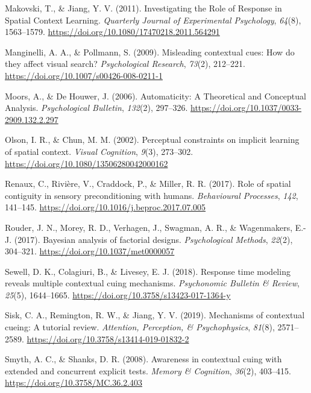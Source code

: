 \documentclass[
  man,
  floatsintext,
  longtable,
  nolmodern,
  notxfonts,
  notimes,
  colorlinks=true,linkcolor=blue,citecolor=blue,urlcolor=blue]{apa7}
\newlength{\cslhangindent}
\newenvironment{CSLReferences}[2] %
 {\begin{list}{}{%
  \setlength{\itemindent}{0pt}
  \setlength{\leftmargin}{0pt}
  \setlength{\parsep}{0pt}
  \ifodd #1
   \setlength{\leftmargin}{\cslhangindent}
   \setlength{\itemindent}{-1\cslhangindent}
  \fi
  \setlength{\itemsep}{#2\baselineskip}}}
 {\end{list}}
\begin{document}
\begin{CSLReferences}{1}{0}
Makovski, T., \& Jiang, Y. V. (2011). Investigating the {Role} of
{Response} in {Spatial Context Learning}. \emph{Quarterly Journal of
Experimental Psychology}, \emph{64}(8), 1563--1579.
\url{https://doi.org/10.1080/17470218.2011.564291}

Manginelli, A. A., \& Pollmann, S. (2009). Misleading contextual cues:
{How} do they affect visual search? \emph{Psychological Research},
\emph{73}(2), 212--221. \url{https://doi.org/10.1007/s00426-008-0211-1}

Moors, A., \& De Houwer, J. (2006). Automaticity: {A Theoretical} and
{Conceptual Analysis}. \emph{Psychological Bulletin}, \emph{132}(2),
297--326. \url{https://doi.org/10.1037/0033-2909.132.2.297}

Olson, I. R., \& Chun, M. M. (2002). Perceptual constraints on implicit
learning of spatial context. \emph{Visual Cognition}, \emph{9}(3),
273--302. \url{https://doi.org/10.1080/13506280042000162}

Renaux, C., Rivière, V., Craddock, P., \& Miller, R. R. (2017). Role of
spatial contiguity in sensory preconditioning with humans.
\emph{Behavioural Processes}, \emph{142}, 141--145.
\url{https://doi.org/10.1016/j.beproc.2017.07.005}

Rouder, J. N., Morey, R. D., Verhagen, J., Swagman, A. R., \&
Wagenmakers, E.-J. (2017). Bayesian analysis of factorial designs.
\emph{Psychological Methods}, \emph{22}(2), 304--321.
\url{https://doi.org/10.1037/met0000057}

Sewell, D. K., Colagiuri, B., \& Livesey, E. J. (2018). Response time
modeling reveals multiple contextual cuing mechanisms. \emph{Psychonomic
Bulletin \& Review}, \emph{25}(5), 1644--1665.
\url{https://doi.org/10.3758/s13423-017-1364-y}

Sisk, C. A., Remington, R. W., \& Jiang, Y. V. (2019). Mechanisms of
contextual cueing: {A} tutorial review. \emph{Attention, Perception, \&
Psychophysics}, \emph{81}(8), 2571--2589.
\url{https://doi.org/10.3758/s13414-019-01832-2}

Smyth, A. C., \& Shanks, D. R. (2008). Awareness in contextual cuing
with extended and concurrent explicit tests. \emph{Memory \& Cognition},
\emph{36}(2), 403--415. \url{https://doi.org/10.3758/MC.36.2.403}


\end{CSLReferences}
\end{document}
